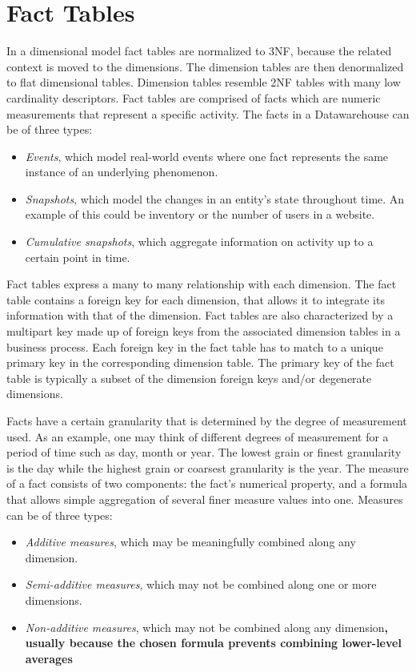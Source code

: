 \documentclass[]{article}
\begin{document}

\section{Fact Tables} %
\label{sec:fact_tables}

In a dimensional model fact tables are normalized to 3NF, because the related context is moved to the dimensions. The dimension tables
are then denormalized to flat dimensional tables. Dimension tables resemble 2NF tables with many low cardinality descriptors. Fact
tables are comprised of facts which are numeric measurements that represent a specific activity. The facts in a Datawarehouse can be of
three types:
\begin{itemize}
	\item \emph{Events}, which model real-world events where one fact represents the same instance of an underlying phenomenon. 
	\item \emph{Snapshots}, which model the changes in an entity's state throughout time. An example of this could be inventory or the number of users in a website.
	\item \emph{Cumulative snapshots}, which aggregate information on activity up to a certain point in time.
\end{itemize}
Fact tables express a many to many relationship with each dimension. The fact table contains a foreign key for each dimension, that
allows it to integrate its information with that of the dimension. Fact tables are also characterized by a multipart key made up of
foreign keys from the associated dimension tables in a business process. Each foreign key in the fact table has to match to a unique
primary key in the corresponding dimension table. The primary key of the fact table is typically a subset of the dimension foreign keys
and/or degenerate dimensions.

Facts have a certain granularity that is determined by the degree of measurement used. As an example, one may think of different degrees
of measurement for a period of time such as day, month or year. The lowest grain or finest granularity is the day while the highest
grain or coarsest granularity is the year.
The measure of a fact consists of two components: the fact's numerical property, and a formula that allows simple aggregation of several
finer measure values into one. Measures can be of three types:
\begin{itemize}
\item \emph{Additive measures}, which may be meaningfully combined along any dimension.
\item \emph{Semi-additive measures}, which may not be combined along one or more dimensions.
\item \emph{Non-additive measures}, which may not be combined along any dimension\textbf{, usually because the chosen formula prevents combining lower-level averages}
\end{itemize}
\end{document}
